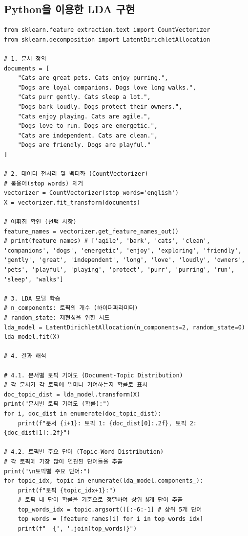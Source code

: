 \documentclass[11pt,a4paper]{article}
\theoremstyle{definition}
\begin{document}
\subsection*{Python을 이용한 LDA 구현}
\begin{lstlisting}[caption={Python을 이용한 LDA 구현 예시}, label={lst:python_lda}]
from sklearn.feature_extraction.text import CountVectorizer
from sklearn.decomposition import LatentDirichletAllocation

# 1. 문서 정의
documents = [
    "Cats are great pets. Cats enjoy purring.",
    "Dogs are loyal companions. Dogs love long walks.",
    "Cats purr gently. Cats sleep a lot.",
    "Dogs bark loudly. Dogs protect their owners.",
    "Cats enjoy playing. Cats are agile.",
    "Dogs love to run. Dogs are energetic.",
    "Cats are independent. Cats are clean.",
    "Dogs are friendly. Dogs are playful."
]

# 2. 데이터 전처리 및 벡터화 (CountVectorizer)
# 불용어(stop words) 제거
vectorizer = CountVectorizer(stop_words='english')
X = vectorizer.fit_transform(documents)

# 어휘집 확인 (선택 사항)
feature_names = vectorizer.get_feature_names_out()
# print(feature_names) # ['agile', 'bark', 'cats', 'clean', 'companions', 'dogs', 'energetic', 'enjoy', 'exploring', 'friendly', 'gently', 'great', 'independent', 'long', 'love', 'loudly', 'owners', 'pets', 'playful', 'playing', 'protect', 'purr', 'purring', 'run', 'sleep', 'walks']

# 3. LDA 모델 학습
# n_components: 토픽의 개수 (하이퍼파라미터)
# random_state: 재현성을 위한 시드
lda_model = LatentDirichletAllocation(n_components=2, random_state=0)
lda_model.fit(X)

# 4. 결과 해석

# 4.1. 문서별 토픽 기여도 (Document-Topic Distribution)
# 각 문서가 각 토픽에 얼마나 기여하는지 확률로 표시
doc_topic_dist = lda_model.transform(X)
print("문서별 토픽 기여도 (확률):")
for i, doc_dist in enumerate(doc_topic_dist):
    print(f"문서 {i+1}: 토픽 1: {doc_dist[0]:.2f}, 토픽 2: {doc_dist[1]:.2f}")

# 4.2. 토픽별 주요 단어 (Topic-Word Distribution)
# 각 토픽에 가장 많이 연관된 단어들을 추출
print("\n토픽별 주요 단어:")
for topic_idx, topic in enumerate(lda_model.components_):
    print(f"토픽 {topic_idx+1}:")
    # 토픽 내 단어 확률을 기준으로 정렬하여 상위 N개 단어 추출
    top_words_idx = topic.argsort()[:-6:-1] # 상위 5개 단어
    top_words = [feature_names[i] for i in top_words_idx]
    print(f"  {', '.join(top_words)}")


\end{lstlisting}
\end{document}
